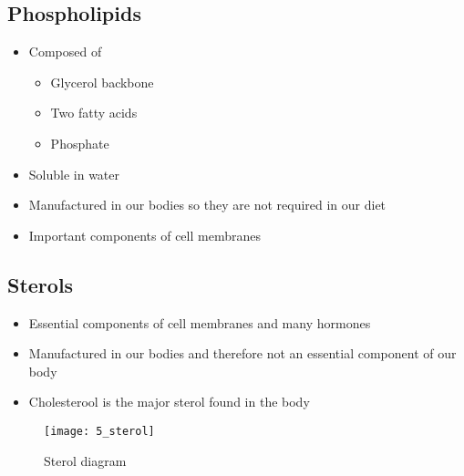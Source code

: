 \documentclass[title={Chapter 5}]{fdsn201notes}
\begin{document}
\subsection{Phospholipids}\label{subsec:phospholipids}
\begin{itemize}
	\item Composed of
	\begin{itemize}
		\item Glycerol backbone
		\item Two fatty acids
		\item Phosphate
	\end{itemize}
	\item Soluble in water
	\item Manufactured in our bodies so they are not required in our diet
	\item Important components of cell membranes
\end{itemize}

\subsection{Sterols}\label{subsec:sterols}
\begin{itemize}
	\item Essential components of cell membranes and many hormones
	\item Manufactured in our bodies and therefore not an essential component of our body
	\item Cholesterool is the major sterol found in the body
\end{itemize}

\begin{figure}[H]
	\centering
	\texttt{[image: 5\_sterol]}
	\caption{Sterol diagram}
	\label{fig:sterol}
\end{figure}
\end{document}
